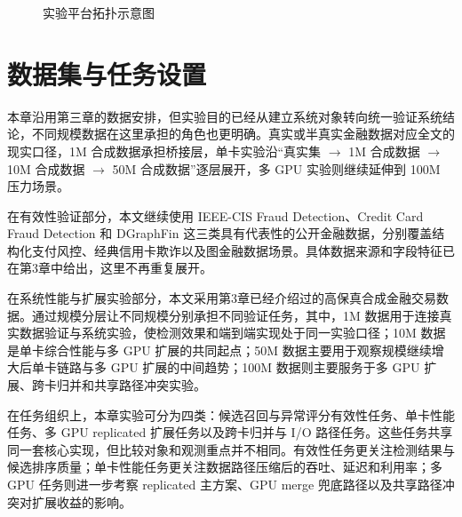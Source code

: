 \begin{figure}[htbp]
{%
  }
  \caption{实验平台拓扑示意图}
  \label{fig:exp-topology}
\end{figure}

\section{数据集与任务设置}

本章沿用第三章的数据安排，但实验目的已经从建立系统对象转向统一验证系统结论，不同规模数据在这里承担的角色也更明确。真实或半真实金融数据对应全文的现实口径，1M 合成数据承担桥接层，单卡实验沿“真实集 $\rightarrow$ 1M 合成数据 $\rightarrow$ 10M 合成数据 $\rightarrow$ 50M 合成数据”逐层展开，多 GPU 实验则继续延伸到 100M 压力场景。

在有效性验证部分，本文继续使用 IEEE-CIS Fraud Detection、Credit Card Fraud Detection 和 DGraphFin 这三类具有代表性的公开金融数据，分别覆盖结构化支付风控、经典信用卡欺诈以及图金融数据场景。具体数据来源和字段特征已在第3章中给出，这里不再重复展开。

在系统性能与扩展实验部分，本文采用第3章已经介绍过的高保真合成金融交易数据。通过规模分层让不同规模分别承担不同验证任务，其中，1M 数据用于连接真实数据验证与系统实验，使检测效果和端到端实现处于同一实验口径；10M 数据是单卡综合性能与多 GPU 扩展的共同起点；50M 数据主要用于观察规模继续增大后单卡链路与多 GPU 扩展的中间趋势；100M 数据则主要服务于多 GPU 扩展、跨卡归并和共享路径冲突实验。

在任务组织上，本章实验可分为四类：候选召回与异常评分有效性任务、单卡性能任务、多 GPU replicated 扩展任务以及跨卡归并与 I/O 路径任务。这些任务共享同一套核心实现，但比较对象和观测重点并不相同。有效性任务更关注检测结果与候选排序质量；单卡性能任务更关注数据路径压缩后的吞吐、延迟和利用率；多 GPU 任务则进一步考察 replicated 主方案、GPU merge 兜底路径以及共享路径冲突对扩展收益的影响。

